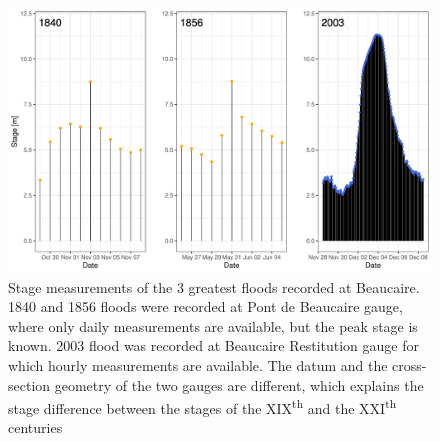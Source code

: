 \documentclass[11pt]{article}
\begin{document}
	\begin{figure}[h]
		\centering
		\includegraphics[width=.9\linewidth]{Supplementary/FloodStages.pdf}
	    \caption{Stage measurements of the 3 greatest floods recorded at Beaucaire. 1840 and 1856 floods were recorded at Pont de Beaucaire gauge, where only daily measurements are available, but the peak stage is known. 2003 flood was recorded at Beaucaire Restitution gauge for which hourly measurements are available. The datum and the cross-section geometry of the two gauges are different, which explains the stage difference between the stages of the XIX\textsuperscript{th} and the XXI\textsuperscript{th} centuries}
	    \label{fig:FloodStages}
	\end{figure}
	
	
	
	
	
\end{document}
